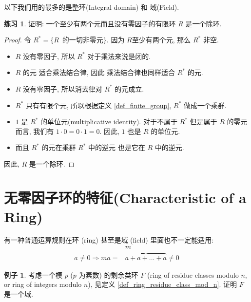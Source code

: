 \documentclass[utf8]{ctexbook}
\theoremstyle{definition}
\newtheorem{example}{例子}[section]
\newtheorem{exercise}{练习}[section]
\begin{document}
以下我们用的最多的是整环(Integral domain) 和 域(Field).


\begin{exercise}
证明: 一个至少有两个元而且没有零因子的有限环 $R$ 是一个除环.
\end{exercise}

\begin{proof}
令 $R^* = \{ R \, \mbox{ 的一切非零元} \}$. 因为 $R$至少有两个元, 那么 $R^*$ 非空. 
\begin{itemize}
\item{$R$ 没有零因子, 所以 $R^*$ 对于乘法来说是闭的.}
\item{$R$ 的元 适合乘法结合律, 因此 乘法结合律也同样适合 $R^*$ 的元.}
\item{$R$ 没有零因子, 所以消去律对 $R^*$ 的元成立.}
\item{$R^*$ 只有有限个元, 所以根据定义 \ref{def_finite_group}, $R^*$ 做成一个乘群.}
\item{$1$ 是 $R^*$ 的单位元(multiplicative identity). 对于不属于 $R^*$ 但是属于 $R$ 的零元而言, 我们有 $ 1 \cdot 0 = 0 \cdot 1 = 0$. 因此, $1$ 也是 $R$ 的单位元.}
\item{而且 $R^*$ 的元在乘群 $R^*$ 中的逆元 也是它在 $R$ 中的逆元. }
\end{itemize}

因此, $R$ 是一个除环.

\end{proof}


\section{无零因子环的特征(Characteristic of a Ring)}


有一种普通运算规则在环 (ring) 甚至是域 (field) 里面也不一定能适用:
\begin{equation}\label{eq_power_non_zero}
\begin{array}{cc}
 & m \\ 
a \neq 0 \Rightarrow  m a  = & \overbrace{a + a + ... + a} \neq 0 
\end{array}
\end{equation}

\begin{example}\label{example_residue_ring_mod_prime_number_field}
考虑一个模 $p$ ($p$ 为素数) 的剩余类环 $F$ (ring of residue classes modulo $n$, or ring of integers modulo $n$), 见定义 \ref{def_ring_residue_class_mod_n}. 证明 $F$ 是一个域.

\end{example}
\end{document}
